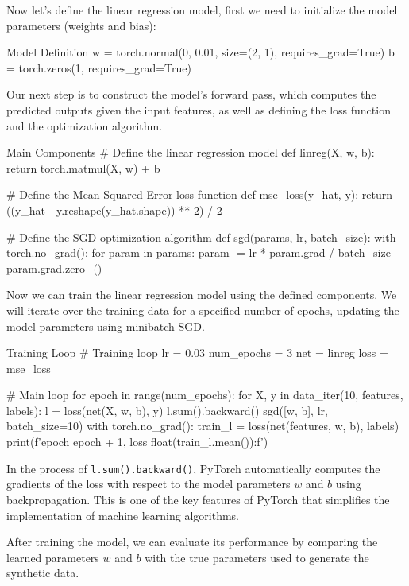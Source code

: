 Now let's define the linear regression model, first we need to initialize the model parameters (weights and bias):
\begin{pythoncode}{Model Definition}
w = torch.normal(0, 0.01, size=(2, 1), requires_grad=True)
b = torch.zeros(1, requires_grad=True)
\end{pythoncode}

Our next step is to construct the model's forward pass, which computes the predicted outputs given the input features, as well as defining the loss function and the optimization algorithm.

\begin{pythoncode}{Main Components}
# Define the linear regression model
def linreg(X, w, b):
    return torch.matmul(X, w) + b

# Define the Mean Squared Error loss function
def mse_loss(y_hat, y):
    return ((y_hat - y.reshape(y_hat.shape)) ** 2) / 2

# Define the SGD optimization algorithm
def sgd(params, lr, batch_size):
    with torch.no_grad():
        for param in params:
            param -= lr * param.grad / batch_size
            param.grad.zero_()
\end{pythoncode}

Now we can train the linear regression model using the defined components. We will iterate over the training data for a specified number of epochs, updating the model parameters using minibatch SGD.

\begin{pythoncode}{Training Loop}
# Training loop
lr = 0.03
num_epochs = 3
net = linreg
loss = mse_loss

# Main loop
for epoch in range(num_epochs):
    for X, y in data_iter(10, features, labels):
        l = loss(net(X, w, b), y)
        l.sum().backward()
        sgd([w, b], lr, batch_size=10)
    with torch.no_grad():
        train_l = loss(net(features, w, b), labels)
        print(f'epoch {epoch + 1}, loss {float(train_l.mean()):f}')
\end{pythoncode}

In the process of \texttt{l.sum().backward()}, PyTorch automatically computes the gradients of the loss with respect to the model parameters \(w\) and \(b\) using backpropagation. This is one of the key features of PyTorch that simplifies the implementation of machine learning algorithms.

After training the model, we can evaluate its performance by comparing the learned parameters \(w\) and \(b\) with the true parameters used to generate the synthetic data.

